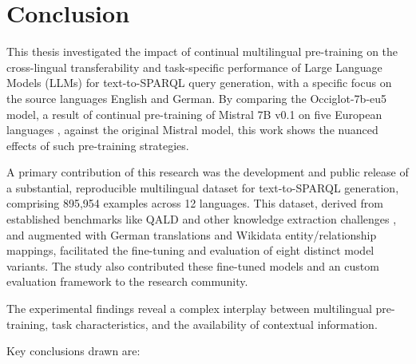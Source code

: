 \section{Conclusion}\label{section::conclusion}

This thesis investigated the impact of continual multilingual pre-training on the cross-lingual transferability and task-specific performance of Large Language Models (LLMs) for text-to-SPARQL query generation, with a specific focus on the source languages English and German. 
By comparing the Occiglot-7b-eu5 model, a result of continual pre-training of Mistral 7B v0.1 on five European languages \cite{avramidis-etal-2024-occiglot}, against the original Mistral model, this work shows the nuanced effects of such pre-training strategies.

A primary contribution of this research was the development and public release of a substantial, reproducible multilingual dataset for text-to-SPARQL generation, comprising 895,954 examples across 12 languages. 
This dataset, derived from established benchmarks like QALD \cite{usbeck2024qald} and other knowledge extraction challenges \cite{jiang2022knowledge}, and augmented with German translations and Wikidata entity/relationship mappings, facilitated the fine-tuning and evaluation of eight distinct model variants. 
The study also contributed these fine-tuned models and an custom evaluation framework to the research community.

The experimental findings reveal a complex interplay between multilingual pre-training, task characteristics, and the availability of contextual information. 

Key conclusions drawn are:

